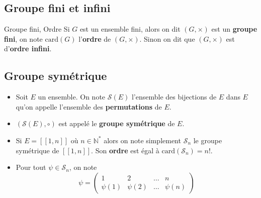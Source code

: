 \subsection{Groupe fini et infini} %


\begin{Definition}[colbacktitle=red!75!black]{Groupe fini, Ordre}{}
Si $G$ est un ensemble fini, alors on dit $(G, \times)$ est un \textbf{groupe fini}, on note $\mathrm{card}(G)$ l'\textbf{ordre} de $(G, \times)$. Sinon on dit que $(G, \times)$ est d'\textbf{ordre infini}.
\end{Definition}



\subsection{Groupe symétrique} %
\label{sub:Groupe symétrique}

\begin{Definition}[colbacktitle=red!75!black]{}{}
  \begin{itemize}

      \item Soit $E$ un ensemble. On note $\mathscr{S}(E)$ l'ensemble des bijections de $E$ dans $E$ qu'on appelle l'ensemble des \textbf{permutations} de $E$.

      \item $(\mathscr{S}(E), \circ)$ est appelé le \textbf{groupe symétrique} de $E$. 

      \item Si $E = [\![1,n ]\!]$ où $n \in \mathbb{N} ^{*}$ alors on note simplement $\mathscr{S}_n$ le groupe symétrique de $[\![1,n]\!]$.  Son \textbf{ordre} est égal à $\mathrm{card}( \mathscr{S}_n) = n!$. 

      \item Pour tout $\psi \in \mathscr{S}_n$, on note 
\begin{equation}
  \psi = \begin{pmatrix}
    1 & 2 & \dots & n \\ 
    \psi(1) & \psi(2) & \dots & \psi(n)
  \end{pmatrix}
\end{equation}

  \end{itemize}
\end{Definition}

